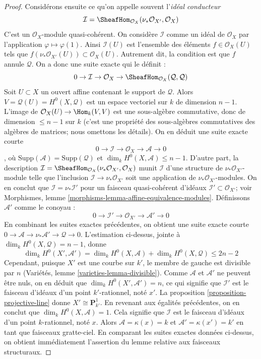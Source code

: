 \begin{proof}
\medskip\noindent
Considérons ensuite ce qu'on appelle souvent l'{\it idéal conducteur} $$
\mathcal{I} = \SheafHom_{\mathcal{O}_X}(\nu_*\mathcal{O}_{X'}, \mathcal{O}_X)
$$ C'est un $\mathcal{O}_X$-module quasi-cohérent. On considère $\mathcal{I}$ comme un idéal de $\mathcal{O}_X$ par l'application $\varphi \mapsto \varphi(1)$. Ainsi $\mathcal{I}(U)$ est l'ensemble des éléments $f \in \mathcal{O}_X(U)$ tels que $f \left(\nu_*\mathcal{O}_{X'}(U)\right) \subset \mathcal{O}_X(U)$. Autrement dit, la condition est que $f$ annule $\mathcal{Q}$. On a donc une suite exacte qui le définit : $$
0 \to \mathcal{I} \to \mathcal{O}_X \to
\SheafHom_{\mathcal{O}_X}(\mathcal{Q}, \mathcal{Q})
$$ Soit $U \subset X$ un ouvert affine contenant le support de $\mathcal{Q}$. Alors $V = \mathcal{Q}(U) = H^0(X, \mathcal{Q})$ est un espace vectoriel sur $k$ de dimension $n - 1$. L'image de $\mathcal{O}_X(U) \to \Hom_k(V, V)$ est une sous-algèbre commutative, donc de dimension $\leq n - 1$ sur $k$ (c'est une propriété des sous-algèbres commutatives des algèbres de matrices; nous omettons les détails). On en déduit une suite exacte courte $$
0 \to \mathcal{I} \to \mathcal{O}_X \to \mathcal{A} \to 0
$$, où $\text{Supp}(\mathcal{A}) = \text{Supp}(\mathcal{Q})$ et $\dim_k H^0(X, \mathcal{A}) \leq n - 1$. D'autre part, la description $\mathcal{I} = \SheafHom_{\mathcal{O}_X}(\nu_*\mathcal{O}_{X'}, \mathcal{O}_X)$ munit $\mathcal{I}$ d'une structure de $\nu_*\mathcal{O}_{X'}$-module telle que l'inclusion $\mathcal{I} \to \nu_*\mathcal{O}_{X'}$ soit une application de $\nu_*\mathcal{O}_{X'}$-modules. On en conclut que $\mathcal{I} = \nu_*\mathcal{I}'$ pour un faisceau quasi-cohérent d'idéaux $\mathcal{I}' \subset \mathcal{O}_{X'}$; voir Morphismes, lemme \ref{morphisms-lemma-affine-equivalence-modules}. Définissons $\mathcal{A}'$ comme le conoyau : $$
0 \to \mathcal{I}' \to \mathcal{O}_{X'} \to \mathcal{A}' \to 0
$$ En combinant les suites exactes précédentes, on obtient une suite exacte courte $0 \to \mathcal{A} \to \nu_*\mathcal{A}' \to \mathcal{Q} \to 0$. L'estimation ci-dessus, jointe à $\dim_k H^0(X, \mathcal{Q}) = n - 1$, donne $$
\dim_k H^0(X', \mathcal{A}') =
\dim_k H^0(X, \mathcal{A}) + \dim_k H^0(X, \mathcal{Q}) \leq 2 n - 2
$$ Cependant, puisque $X'$ est une courbe sur $k'$, le membre de gauche est divisible par $n$ (Variétés, lemme \ref{varieties-lemma-divisible}). Comme $\mathcal{A}$ et $\mathcal{A}'$ ne peuvent être nuls, on en déduit que $\dim_k H^0(X', \mathcal{A}') = n$, ce qui signifie que $\mathcal{I}'$ est le faisceau d'idéaux d'un point $k'$-rationnel, noté $x'$. La proposition \ref{proposition-projective-line} donne $X' \cong \mathbf{P}^1_{k'}$. En revenant aux égalités précédentes, on en conclut que $\dim_k H^0(X, \mathcal{A}) = 1$. Cela signifie que $\mathcal{I}$ est le faisceau d'idéaux d'un point $k$-rationnel, noté $x$. Alors $\mathcal{A} = \kappa(x) = k$ et $\mathcal{A}' = \kappa(x') = k'$ en tant que faisceaux gratte-ciel. En comparant les suites exactes données ci-dessus, on obtient immédiatement l'assertion du lemme relative aux faisceaux structuraux.
\end{proof}

